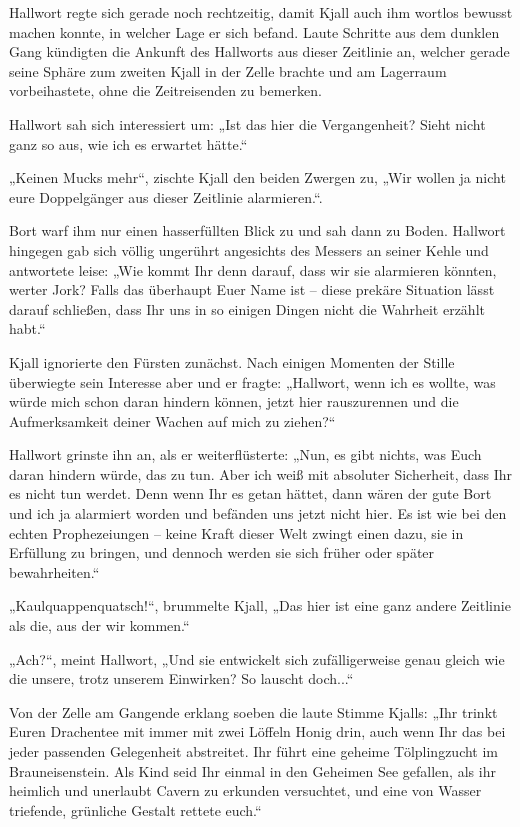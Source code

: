 Hallwort regte sich gerade noch rechtzeitig, damit Kjall auch ihm wortlos bewusst machen konnte, in welcher Lage er sich befand. Laute Schritte aus dem dunklen Gang kündigten die Ankunft des Hallworts aus dieser Zeitlinie an, welcher gerade seine Sphäre zum zweiten Kjall in der Zelle brachte und am Lagerraum vorbeihastete, ohne die Zeitreisenden zu bemerken.

Hallwort sah sich interessiert um: „Ist das hier die Vergangenheit? Sieht nicht ganz so aus, wie ich es erwartet hätte.“

„Keinen Mucks mehr“, zischte Kjall den beiden Zwergen zu, „Wir wollen ja nicht eure Doppelgänger aus dieser Zeitlinie alarmieren.“.

Bort warf ihm nur einen hasserfüllten Blick zu und sah dann zu Boden. Hallwort hingegen gab sich völlig ungerührt angesichts des Messers an seiner Kehle und antwortete leise: „Wie kommt Ihr denn darauf, dass wir sie alarmieren könnten, werter Jork? Falls das überhaupt Euer Name ist – diese prekäre Situation lässt darauf schließen, dass Ihr uns in so einigen Dingen nicht die Wahrheit erzählt habt.“

Kjall ignorierte den Fürsten zunächst. Nach einigen Momenten der Stille überwiegte sein Interesse aber und er fragte: „Hallwort, wenn ich es wollte, was würde mich schon daran hindern können, jetzt hier rauszurennen und die Aufmerksamkeit deiner Wachen auf mich zu ziehen?“

Hallwort grinste ihn an, als er weiterflüsterte: „Nun, es gibt nichts, was Euch daran hindern würde, das zu tun. Aber ich weiß mit absoluter Sicherheit, dass Ihr es nicht tun werdet. Denn wenn Ihr es getan hättet, dann wären der gute Bort und ich ja alarmiert worden und befänden uns jetzt nicht hier. Es ist wie bei den echten Prophezeiungen – keine Kraft dieser Welt zwingt einen dazu, sie in Erfüllung zu bringen, und dennoch werden sie sich früher oder später bewahrheiten.“

„Kaulquappenquatsch!“, brummelte Kjall, „Das hier ist eine ganz andere Zeitlinie als die, aus der wir kommen.“

„Ach?“, meint Hallwort, „Und sie entwickelt sich zufälligerweise genau gleich wie die unsere, trotz unserem Einwirken? So lauscht doch...“

Von der Zelle am Gangende erklang soeben die laute Stimme Kjalls: „Ihr trinkt Euren Drachentee mit immer mit zwei Löffeln Honig drin, auch wenn Ihr das bei jeder passenden Gelegenheit abstreitet. Ihr führt eine geheime Tölplingzucht im Brauneisenstein. Als Kind seid Ihr einmal in den Geheimen See gefallen, als ihr heimlich und unerlaubt Cavern zu erkunden versuchtet, und eine von Wasser triefende, grünliche Gestalt rettete euch.“

